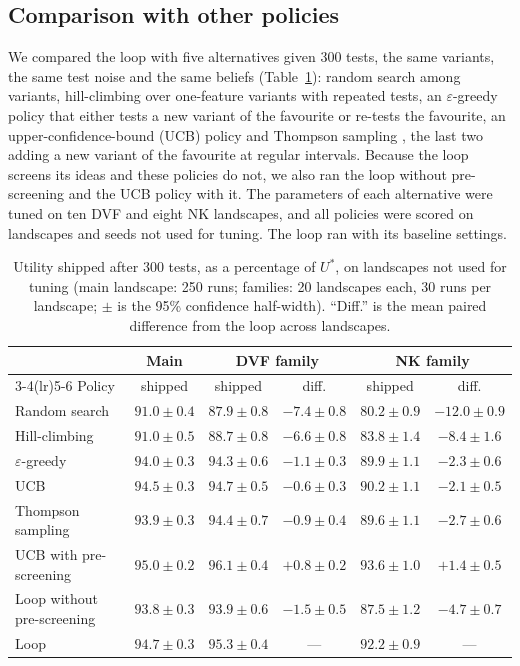 \documentclass[preprint,review,11pt,authoryear]{elsarticle}
\theoremstyle{definition}
\begin{document}
\subsection{Comparison with other policies}
\label{sec:baselines}

We compared the loop with five alternatives given 300 tests, the same variants, the same test noise and the same beliefs (Table~\ref{tab:baselines}): random search among variants, hill-climbing over one-feature variants with repeated tests, an $\varepsilon$-greedy policy that either tests a new variant of the favourite or re-tests the favourite, an upper-confidence-bound (UCB) policy \citep{auer2002} and Thompson sampling \citep{russo2018}, the last two adding a new variant of the favourite at regular intervals. Because the loop screens its ideas and these policies do not, we also ran the loop without pre-screening and the UCB policy with it. The parameters of each alternative were tuned on ten DVF and eight NK landscapes, and all policies were scored on landscapes and seeds not used for tuning. The loop ran with its baseline settings.

\begin{table}[t]
\caption{Utility shipped after 300 tests, as a percentage of $U^*$, on landscapes not used for tuning (main landscape: 250 runs; families: 20 landscapes each, 30 runs per landscape; $\pm$ is the 95\% confidence half-width). ``Diff.'' is the mean paired difference from the loop across landscapes.}
\label{tab:baselines}
\centering\footnotesize\setlength{\tabcolsep}{4pt}
\begin{tabular}{@{}lccccc@{}}
\toprule
& Main & \multicolumn{2}{c}{DVF family} & \multicolumn{2}{c}{NK family}\\
\cmidrule(lr){3-4}\cmidrule(lr){5-6}
Policy & shipped & shipped & diff. & shipped & diff.\\
\midrule
Random search & $91.0\pm0.4$ & $87.9\pm0.8$ & $-7.4\pm0.8$ & $80.2\pm0.9$ & $-12.0\pm0.9$\\
Hill-climbing & $91.0\pm0.5$ & $88.7\pm0.8$ & $-6.6\pm0.8$ & $83.8\pm1.4$ & $-8.4\pm1.6$\\
$\varepsilon$-greedy & $94.0\pm0.3$ & $94.3\pm0.6$ & $-1.1\pm0.3$ & $89.9\pm1.1$ & $-2.3\pm0.6$\\
UCB & $94.5\pm0.3$ & $94.7\pm0.5$ & $-0.6\pm0.3$ & $90.2\pm1.1$ & $-2.1\pm0.5$\\
Thompson sampling & $93.9\pm0.3$ & $94.4\pm0.7$ & $-0.9\pm0.4$ & $89.6\pm1.1$ & $-2.7\pm0.6$\\
\addlinespace[2pt]
UCB with pre-screening & $95.0\pm0.2$ & $96.1\pm0.4$ & $+0.8\pm0.2$ & $93.6\pm1.0$ & $+1.4\pm0.5$\\
Loop without pre-screening & $93.8\pm0.3$ & $93.9\pm0.6$ & $-1.5\pm0.5$ & $87.5\pm1.2$ & $-4.7\pm0.7$\\
Loop & $94.7\pm0.3$ & $95.3\pm0.4$ & --- & $92.2\pm0.9$ & ---\\
\bottomrule
\end{tabular}
\end{table}
\end{document}
